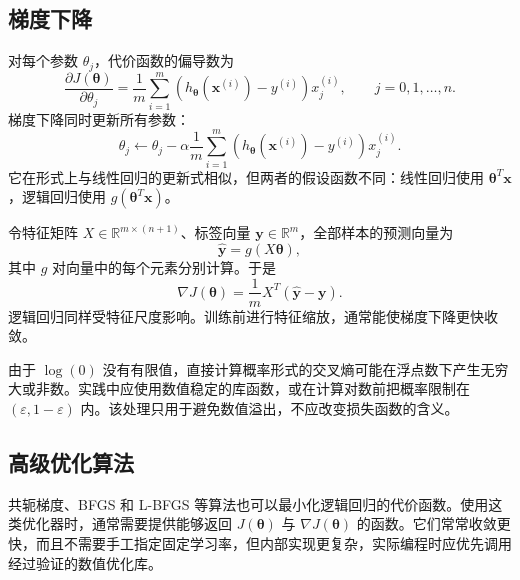 \documentclass[12pt,a4paper]{ctexart}
\begin{document}
\subsection{梯度下降}

\begin{definitionbox}[逻辑回归的梯度]
对每个参数 $\theta_j$，代价函数的偏导数为
\[
  \frac{\partial J(\boldsymbol{\theta})}{\partial\theta_j}
  =\frac{1}{m}\sum_{i=1}^{m}
  \left(
    h_{\boldsymbol{\theta}}\!\left(\mathbf{x}^{(i)}\right)-y^{(i)}
  \right)x_j^{(i)},
  \qquad j=0,1,\ldots,n.
\]
梯度下降同时更新所有参数：
\[
  \theta_j\leftarrow\theta_j
  -\alpha\frac{1}{m}\sum_{i=1}^{m}
  \left(
    h_{\boldsymbol{\theta}}\!\left(\mathbf{x}^{(i)}\right)-y^{(i)}
  \right)x_j^{(i)}.
\]
它在形式上与线性回归的更新式相似，但两者的假设函数不同：线性回归使用 $\boldsymbol{\theta}^T\mathbf{x}$，逻辑回归使用 $g(\!\boldsymbol{\theta}^T\mathbf{x})$。
\end{definitionbox}

\begin{tipbox}[向量化与特征缩放]
令特征矩阵 $X\in\mathbb{R}^{m\times(n+1)}$、标签向量 $\mathbf{y}\in\mathbb{R}^{m}$，全部样本的预测向量为
\[
  \hat{\mathbf{y}}=g(X\boldsymbol{\theta}),
\]
其中 $g$ 对向量中的每个元素分别计算。于是
\[
  \nabla J(\boldsymbol{\theta})
  =\frac{1}{m}X^T(\hat{\mathbf{y}}-\mathbf{y}).
\]
逻辑回归同样受特征尺度影响。训练前进行特征缩放，通常能使梯度下降更快收敛。
\end{tipbox}

\begin{mistakebox}[实现交叉熵时的数值问题]
由于 $\log(0)$ 没有有限值，直接计算概率形式的交叉熵可能在浮点数下产生无穷大或非数。实践中应使用数值稳定的库函数，或在计算对数前把概率限制在 $(\varepsilon,1-\varepsilon)$ 内。该处理只用于避免数值溢出，不应改变损失函数的含义。
\end{mistakebox}

\subsection{高级优化算法}

\begin{tipbox}[梯度下降以外的选择]
共轭梯度、BFGS 和 L-BFGS 等算法也可以最小化逻辑回归的代价函数。使用这类优化器时，通常需要提供能够返回 $J(\boldsymbol{\theta})$ 与 $\nabla J(\boldsymbol{\theta})$ 的函数。它们常常收敛更快，而且不需要手工指定固定学习率，但内部实现更复杂，实际编程时应优先调用经过验证的数值优化库。
\end{tipbox}
\end{document}

